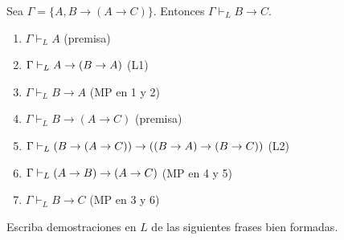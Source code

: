 \begin{example}
Sea $\Gamma = \{ A, B \to (A \to C) \}$. Entonces $\Gamma \vdash_L B \to C$.

\begin{enumerate}
    \item $\Gamma \vdash_L A$               \hfill (premisa)
    \item $\Gamma \vdash_L A \to (B \to A)$          \hfill (L1)
    \item $\Gamma \vdash_L B \to A$         \hfill (MP en 1 y 2)
    \item $\Gamma \vdash_L B \to (A \to C)$ \hfill (premisa)
    \item $\Gamma \vdash_L (B \to (A \to C)) \to ((B \to A) \to (B \to C))$        \hfill (L2)
    \item $\Gamma \vdash_L (A \to B) \to (A \to C)$        \hfill (MP en 4 y 5)
    \item $\Gamma \vdash_L B \to C$         \hfill (MP en 3 y 6)
\end{enumerate}
\end{example}

\begin{exercise}
Escriba demostraciones en $L$ de las siguientes frases bien formadas.
\end{exercise}

